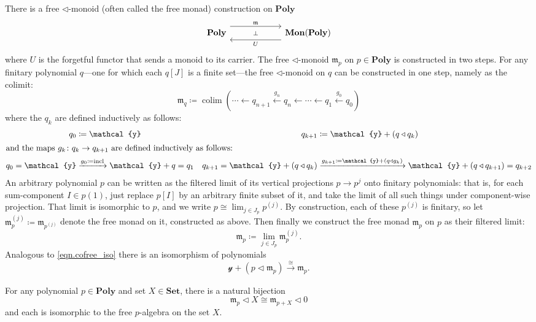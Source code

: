 \documentclass[11pt, one side, article]{memoir}
\theoremstyle{definition}
\theoremstyle{plain}
\DeclareMathOperator*{\colim}{colim}
\newcommand{\Cat}[1]{\mathbf{#1}}%
\newcommand{\To}[2][]{\xrightarrow[#1]{#2}}
\newcommand{\from}{\leftarrow}
\newcommand{\From}[1]{\xleftarrow{#1}}
\newcommand{\tn}[1]{\textnormal{#1}}
\newcommand{\smset}{\Cat{Set}}
\newcommand{\yon}{\mathcal{y}}
\newcommand{\poly}{\Cat{Poly}}
\newcommand{\0}{\textsf{0}}
\newcommand{\1}{\tn{\textsf{1}}}
\newcommand{\tri}{\mathbin{\triangleleft}}
\begin{document}
There is a free $\tri$-monoid (often called the free monad) construction on $\poly$
\begin{equation}
\begin{tikzcd}[column sep=60pt]
	\poly
  	\ar[from=r, shift left=8pt, "U"]
		\ar[from=r, phantom, "\scriptstyle\bot"]
  	&
	\Cat{Mon}(\poly)
		\ar[from=l, shift right=-8pt, "\mathfrak{m}"]
\end{tikzcd}
\end{equation}
where $U$ is the forgetful functor that sends a monoid to its carrier. The free $\tri$-monoid $\mathfrak{m}_p$ on $p\in\poly$ is constructed in two steps. For any finitary polynomial $q$---one for which each $q[J]$ is a finite set---the free $\tri$-monoid on $q$ can be constructed in one step, namely as the colimit:
\begin{equation}
	\mathfrak{m}_q\coloneqq\colim(\cdots\from q_{n+1}\From{g_n}q_n\from\cdots\from q_1\From{g_0} q_0)
\end{equation}
where the $q_k$ are defined inductively as follows:
\begin{align}
	q_0&\coloneqq \yon&q_{k+1}&\coloneqq \yon+(q\tri q_k)\\
\intertext{and the maps $g_k\colon q_{k}\to q_{k+1}$ are defined inductively as follows:}
	q_0=\yon&\To{g_0\coloneqq\tn{incl}}\yon+q=q_1&q_{k+1}=\yon+(q\tri q_{k})&\To{g_{k+1}\coloneqq\yon+(q\tri g_k)}\yon+(q\tri q_{k+1})=q_{k+2}
\end{align}
An arbitrary polynomial $p$ can be written as the filtered limit of its vertical projections $p\to p^{j}$ onto finitary polynomials: that is, for each sum-component $I\in p(1)$, just replace $p[I]$ by an arbitrary finite subset of it, and take the limit of all such things under component-wise projection. That limit is isomorphic to $p$, and we write $p\cong\lim_{j\in J_p}p^{(j)}$. By construction, each of these $p^{(j)}$ is finitary, so let $\mathfrak{m}_p^{(j)}\coloneqq\mathfrak{m}_{p^{(j)}}$ denote the free monad on it, constructed as above. Then finally we construct the free monad $\mathfrak{m}_p$ on $p$ as their filtered limit:
\begin{equation}
	\mathfrak{m}_p\coloneqq\lim_{j\in J_p}\mathfrak{m}_p^{(j)}.
\end{equation}
Analogous to \cref{eqn.cofree_iso} there is an isomorphism of polynomials
\begin{equation}
	 \yon+(p\tri\mathfrak{m}_p)\To{\cong}\mathfrak{m}_p.
	\end{equation}


For any polynomial $p\in\poly$ and set $X\in\smset$, there is a natural bijection
\begin{equation}
  \mathfrak{m}_p\tri X
  \cong
	\mathfrak{m}_{p+X}\tri 0  
\end{equation}
and each is isomorphic to the free $p$-algebra on the set $X$.
\end{document}
